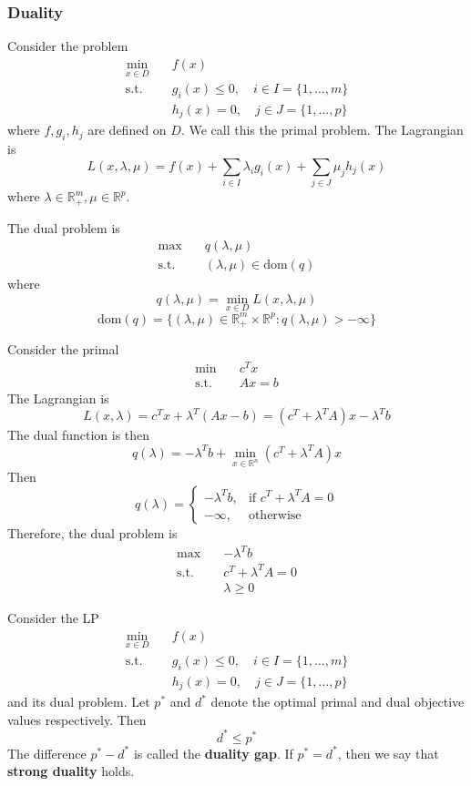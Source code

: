 \subsubsection{Duality}
Consider the problem
\begin{align*}
    \min_{x \in D} \quad &f(x) \\
    \mathrm{s.t.} \quad &g_i(x) \leq 0, \quad i \in I = \{1,\ldots,m\} \\
    &h_j(x) = 0, \quad j \in J = \{1,\ldots,p\}
\end{align*}
where $f, g_i, h_j$ are defined on $D$. We call this the primal problem. The Lagrangian is
$$L(x, \lambda, \mu) = f(x) + \sum_{i \in I} \lambda_i g_i(x) + \sum_{j \in J} \mu_j h_j(x)$$
where $\lambda \in \mathbb R^m_+, \mu \in \mathbb R^p$.

\bigskip
The dual problem is
\begin{align*}
    \max \quad &q(\lambda, \mu) \\
    \text{s.t.} \quad &(\lambda, \mu) \in \mathrm{dom}(q)
\end{align*}
where $$q(\lambda, \mu) = \min_{x \in D} L(x, \lambda, \mu)$$ $$\mathrm{dom}(q) = \{(\lambda, \mu) \in \mathbb R^m_+ \times \mathbb R^p: q(\lambda, \mu) > -\infty\}$$

\begin{example}
    Consider the primal 
    \begin{align*}
        \min \quad &c^Tx \\
        \text{s.t.} \quad &Ax = b
    \end{align*}
    The Lagrangian is $$L(x, \lambda) = c^Tx + \lambda^T(Ax - b) = (c^T + \lambda^TA)x - \lambda^Tb$$
    The dual function is then $$q(\lambda) =  -\lambda^Tb + \min_{x \in \mathbb R^n} (c^T + \lambda^TA)x$$
    Then $$q(\lambda) = \begin{cases}
        -\lambda^Tb, &\text{if } c^T + \lambda^TA = 0 \\
        -\infty, &\text{otherwise}
    \end{cases}$$ Therefore, the dual problem is 
    \begin{align*}
        \max \quad &-\lambda^Tb \\
        \text{s.t.} \quad &c^T + \lambda^TA = 0 \\
        &\lambda \geq 0
    \end{align*}
\end{example}
\begin{theorem}
    Consider the LP
    \begin{align*}
        \min_{x \in D} \quad &f(x) \\
        \mathrm{s.t.} \quad &g_i(x) \leq 0, \quad i \in I = \{1,\ldots,m\} \\
        &h_j(x) = 0, \quad j \in J = \{1,\ldots,p\}
    \end{align*}
    and its dual problem. Let $p^*$ and $d^*$ denote the optimal primal and dual objective values respectively. Then $$d^* \leq p^*$$
    The difference $p^* - d^*$ is called the \textbf{duality gap}. If $p^* = d^*$, then we say that \textbf{strong duality} holds.
\end{theorem}